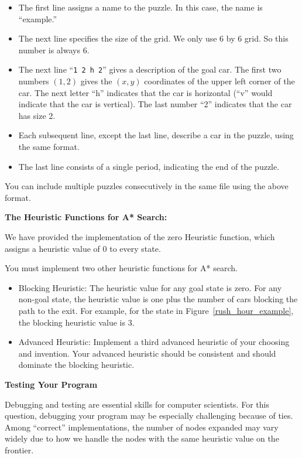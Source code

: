 \documentclass[12pt]{article}
\begin{document}
\begin{itemize}
\item The first line assigns a name to the puzzle. In this case, the name is ``example.''
\item The next line specifies the size of the grid. We only use 6 by 6 grid. So this number is always 6.
\item The next line ``\verb+1 2 h 2+'' gives a description of the goal car.  The first two numbers $(1,2)$ gives the $(x,y)$ coordinates of the upper left corner of the car. The next letter ``h'' indicates that the car is horizontal (``v'' would indicate that the car is vertical). The last number ``2'' indicates that the car has size 2.
\item Each subsequent line, except the last line, describe a car in the puzzle, using the same format.
\item The last line consists of a single period, indicating the end of the puzzle. 
\end{itemize}

You can include multiple puzzles consecutively in the same file using the above format. 

{\bf The Heuristic Functions for A* Search:}

We have provided the implementation of the zero Heuristic function, which assigns a heuristic value of 0 to every state.

You must implement two other heuristic functions for A* search.
\begin{itemize}

  \item Blocking Heuristic: The heuristic value for any goal state is zero. For any non-goal state, the heuristic value is one plus the number of cars blocking the path to the exit. For example, for the state in Figure~\ref{rush_hour_example}, the blocking heuristic value is $3$.
  
  \item Advanced Heuristic: Implement a third advanced heuristic of your choosing and invention. Your advanced heuristic should be consistent and should dominate the blocking heuristic.
  
\end{itemize}

{\bf Testing Your Program}

Debugging and testing are essential skills for computer scientists. For this question, debugging your program may be especially challenging because of ties. Among ``correct'' implementations, the number of nodes expanded may vary widely due to how we handle the nodes with the same heuristic value on the frontier. 
\end{document}
